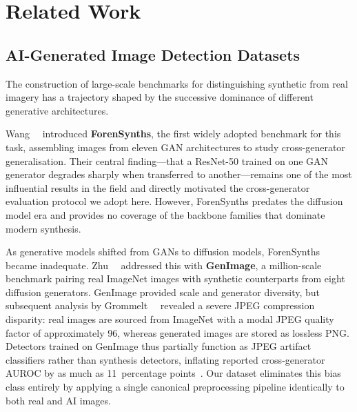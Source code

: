 
\section{Related Work}
\label{sec:related}

\subsection{AI-Generated Image Detection Datasets}
\label{ssec:datasets}

The construction of large-scale benchmarks for distinguishing
synthetic from real imagery has a trajectory shaped by the
successive dominance of different generative architectures.

Wang~\etal~\cite{wang2020cnn} introduced \textbf{ForenSynths}, the
first widely adopted benchmark for this task, assembling images from
eleven GAN architectures to study cross-generator generalisation.
Their central finding---that a ResNet-50 trained on one GAN generator
degrades sharply when transferred to another---remains one of the
most influential results in the field and directly motivated the
cross-generator evaluation protocol we adopt here.
However, ForenSynths predates the diffusion model era and provides
no coverage of the backbone families that dominate modern synthesis.

As generative models shifted from GANs to diffusion models,
ForenSynths became inadequate.
Zhu~\etal~\cite{zhu2023genimage} addressed this with
\textbf{GenImage}, a million-scale benchmark pairing real ImageNet
images with synthetic counterparts from eight diffusion generators.
GenImage provided scale and generator diversity, but subsequent
analysis by Grommelt~\etal~\cite{grommelt2024jpeg} revealed a severe
JPEG compression disparity: real images are sourced from ImageNet
with a modal JPEG quality factor of approximately 96, whereas
generated images are stored as lossless PNG.
Detectors trained on GenImage thus partially function as JPEG
artifact classifiers rather than synthesis detectors, inflating
reported cross-generator AUROC by as much as 11~percentage
points~\cite{grommelt2024jpeg}.
Our dataset eliminates this bias class entirely by applying a single
canonical preprocessing pipeline identically to both real and AI
images.

